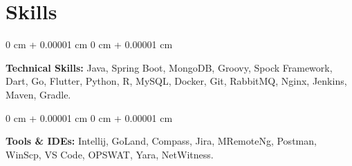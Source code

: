 \documentclass[10pt, letterpaper]{article}
\newenvironment{onecolentry}{
    \begin{adjustwidth}{
        0 cm + 0.00001 cm
    }{
        0 cm + 0.00001 cm
    }
}{
    \end{adjustwidth}
} %
\begin{document}
    \section{Skills}



        
        \begin{onecolentry}
            \textbf{Technical Skills:} Java, Spring Boot, MongoDB, Groovy, Spock Framework, Dart,  Go, Flutter, Python, R, MySQL, Docker, Git, RabbitMQ, Nginx, Jenkins, Maven, Gradle. \end{onecolentry}

        \vspace{0.2 cm}

        \begin{onecolentry}
            \textbf{Tools \& IDEs:} Intellij, GoLand, Compass, Jira, MRemoteNg, Postman, WinScp, VS Code, OPSWAT, Yara, NetWitness.
        \end{onecolentry}
   
      
\end{document}
